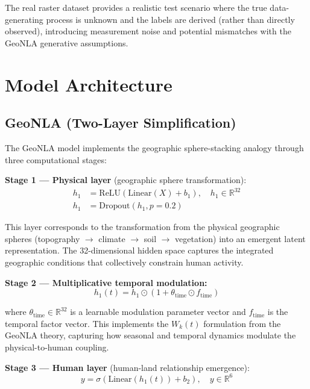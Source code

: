 \documentclass[a4paper,11pt]{article}
\begin{document}
The real raster dataset provides a realistic test scenario where the true data-generating process is unknown and the labels are derived (rather than directly observed), introducing measurement noise and potential mismatches with the GeoNLA generative assumptions.

\section{Model Architecture}
\label{sec:model_architecture}

\subsection{GeoNLA (Two-Layer Simplification)}
\label{subsec:geonla}

The GeoNLA model implements the geographic sphere-stacking analogy through three computational stages:

\textbf{Stage 1 --- Physical layer} (geographic sphere transformation):
\begin{align}
    h_1 &= \text{ReLU}(\text{Linear}(X) + b_1), \quad h_1 \in \mathbb{R}^{32} \\
    h_1 &= \text{Dropout}(h_1, p=0.2)
\end{align}

This layer corresponds to the transformation from the physical geographic spheres (topography $\to$ climate $\to$ soil $\to$ vegetation) into an emergent latent representation. The 32-dimensional hidden space captures the integrated geographic conditions that collectively constrain human activity.

\textbf{Stage 2 --- Multiplicative temporal modulation:}
\begin{equation}
    h_1(t) = h_1 \odot (1 + \theta_{\text{time}} \odot f_{\text{time}})
\end{equation}

where $\theta_{\text{time}} \in \mathbb{R}^{32}$ is a learnable modulation parameter vector and $f_{\text{time}}$ is the temporal factor vector. This implements the $W_k(t)$ formulation from the GeoNLA theory, capturing how seasonal and temporal dynamics modulate the physical-to-human coupling.

\textbf{Stage 3 --- Human layer} (human-land relationship emergence):
\begin{equation}
    y = \sigma(\text{Linear}(h_1(t)) + b_2), \quad y \in \mathbb{R}^{6}
\end{equation}
\end{document}
